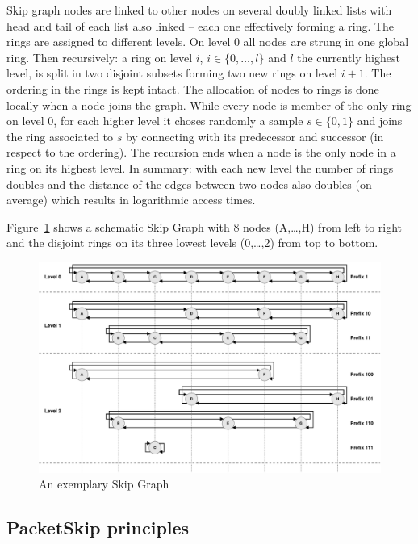 Skip graph nodes are linked to other nodes on several doubly linked lists with head and tail of each list also linked -- each one effectively forming a ring. The rings are assigned to different levels. On level 0 all nodes are strung in one global ring. Then recursively: a ring on level $i$, $i \in \{0,\dots,l\}$ and $l$ the currently highest level, is split in two disjoint subsets forming two new rings on level $i+1$. The ordering in the rings is kept intact. The allocation of nodes to rings is done locally when a node joins the graph. While every node is member of the only ring on level 0, for each higher level it choses randomly a sample $s \in \{0, 1\}$ and joins the ring associated to $s$ by connecting with its predecessor and successor (in respect to the ordering). The recursion ends when a node is the only node in a ring on its highest level. In summary: with each new level the number of rings doubles and the distance of the edges between two nodes also doubles (on average) which results in logarithmic access times.

Figure~\ref{fig:skipgraph} shows a schematic Skip Graph with 8 nodes (A,\dots,H) from left to right and the disjoint rings on its three lowest levels (0,\dots,2) from top to bottom.

\begin{figure}[htbp]
	\centering
	\includegraphics[width=1\linewidth]{graphics/skipgraph}
	\caption{An exemplary Skip Graph}
	\label{fig:skipgraph}
\end{figure}

\subsection{PacketSkip principles}
\label{subsec:packetskip}


